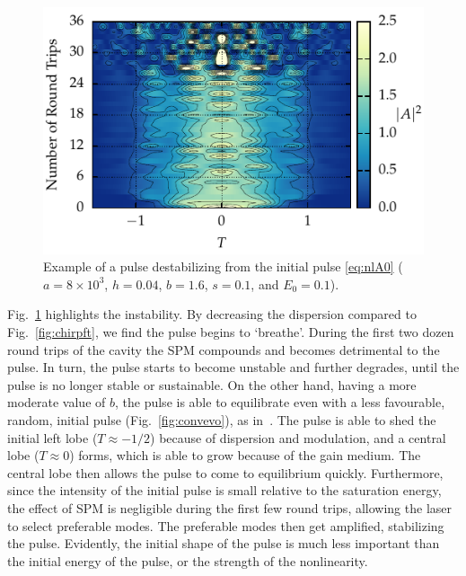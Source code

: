 \documentclass[9pt,twocolumn,twoside]{osajnl}
\begin{document}
\begin{figure}[tbp]
	\centering
	\includegraphics{Figures/Break}
	\caption{Example of a pulse destabilizing from the initial pulse \eqref{eq:nlA0} ($a = 8 \times 10^3$, $h = 0.04$, $b = 1.6$, $s = 0.1$, and $E_0 = 0.1$).}
	\label{fig:breakevo}
\end{figure}

Fig.~\ref{fig:breakevo} highlights the instability. By decreasing the dispersion compared to Fig.~\ref{fig:chirpft}, we find the pulse begins to `breathe'. During the first two dozen round trips of the cavity the SPM compounds and becomes detrimental to the pulse. In turn, the pulse starts to become unstable and further degrades, until the pulse is no longer stable or sustainable. On the other hand, having a more moderate value of $b$, the pulse is able to equilibrate even with a less favourable, random, initial pulse (Fig.~\ref{fig:convevo}), as in~\cite{meng2020}. The pulse is able to shed the initial left lobe ($T \approx -1 / 2$) because of dispersion and modulation, and a central lobe ($T \approx 0$) forms, which is able to grow because of the gain medium. The central lobe then allows the pulse to come to equilibrium quickly. Furthermore, since the intensity of the initial pulse is small relative to the saturation energy, the effect of SPM is negligible during the first few round trips, allowing the laser to select preferable modes. The preferable modes then get amplified, stabilizing the pulse. Evidently, the initial shape of the pulse is much less important than the initial energy of the pulse, or the strength of the nonlinearity.
\end{document}
